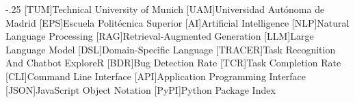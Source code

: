 \documentclass[headsepline,footsepline,footinclude=false,oneside,fontsize=11pt,paper=a4,listof=totoc,bibliography=totoc]{scrbook} %
\begin{document}

\frontmatter{}





\tableofcontents{}

\mainmatter{}









\appendix{}


\begin{acronym}
	\itemsep-.25\baselineskip
	[TUM]{Technical University of Munich}
  [UAM]{Universidad Autónoma de Madrid}
  [EPS]{Escuela Politécnica Superior}
  [AI]{Artificial Intelligence}
  [NLP]{Natural Language Processing}
  [RAG]{Retrieval-Augmented Generation}
  [LLM]{Large Language Model}
  [DSL]{Domain-Specific Language}
  [TRACER]{Task Recognition And Chatbot ExploreR}
  [BDR]{Bug Detection Rate}
  [TCR]{Task Completion Rate}
  [CLI]{Command Line Interface}
  [API]{Application Programming Interface}
  [JSON]{JavaScript Object Notation}
  [PyPI]{Python Package Index}
\end{acronym}

\listoffigures{}
\listoftables{}
\printbibliography{}
\end{document}
